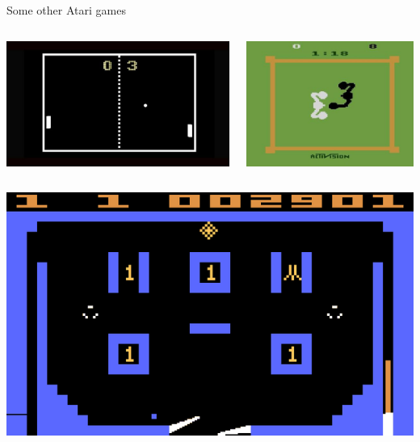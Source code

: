 \documentclass{beamer}
\begin{document}
\begin{frame}{Some other Atari games}
\begin{columns}
\centering
\includegraphics[scale = 0.2]{Images/atari_pong}

\centering
\includegraphics[scale = 0.2]{Images/atari_boxing}
\end{columns}
\vspace*{0.5cm}
\centering
\includegraphics[scale = 0.2]{Images/atari_video-pinball}
\end{frame}
\end{document}
